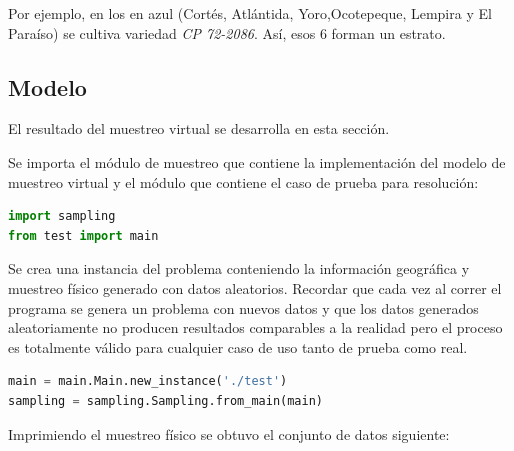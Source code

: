 \documentclass{article}
\begin{document}
\bigbreak

Por ejemplo, en los  en azul (Cortés, Atlántida, Yoro,Ocotepeque, Lempira y El Paraíso) se cultiva variedad \textit{CP 72-2086}. Así, esos $6$  forman un estrato.

\subsection{Modelo}

El resultado del muestreo virtual se desarrolla en esta sección.

\bigbreak

Se importa el módulo de muestreo que contiene la implementación del modelo de muestreo virtual y el módulo que contiene el caso de prueba para resolución:

\bigbreak

\begin{lstlisting}[language=Python, caption=Importar dependencias]
import sampling
from test import main
\end{lstlisting}

\bigbreak

Se crea una instancia del problema conteniendo la información geográfica y muestreo físico generado con datos aleatorios. Recordar que cada vez al correr el programa se genera un problema con nuevos datos y que los datos generados aleatoriamente no producen resultados comparables a la realidad pero el proceso es totalmente válido para cualquier caso de uso tanto de prueba como real.

\bigbreak

\begin{lstlisting}[language=Python, caption=Importar dependencias]
main = main.Main.new_instance('./test')
sampling = sampling.Sampling.from_main(main)
\end{lstlisting}

\bigbreak

Imprimiendo el muestreo físico se obtuvo el conjunto de datos siguiente:
\end{document}
